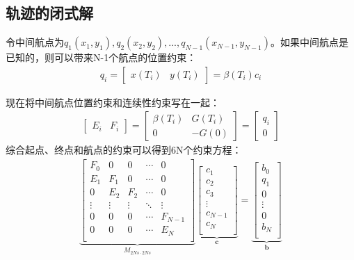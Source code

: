 \documentclass[master,academic]{ysuthesis} %
\begin{document}
		\subsection{轨迹的闭式解} 
		令中间航点为$q_1(x_1,y_1),q_2(x_2,y_2),...,q_{N-1}(x_{N-1},y_{N-1})$。如果中间航点是已知的，则可以带来N-1个航点的位置约束：
		\begin{equation}
			\begin{aligned}
				q_i = \begin{bmatrix}
					x(T_i)& y(T_i)
				\end{bmatrix} = \beta(T_i)c_i
			\end{aligned}
		\end{equation}
		
		现在将中间航点位置约束和连续性约束写在一起：
		\begin{equation}
			\begin{aligned}
				\begin{bmatrix}
					E_i &F_i
				\end{bmatrix}=
				\begin{bmatrix}
					\beta ( T_i )& G( T_i ) \\
					0 & -G( 0 )
				\end{bmatrix}  =\begin{bmatrix}
					q_i\\
					0
				\end{bmatrix}
			\end{aligned}
		\end{equation}
		综合起点、终点和航点的约束可以得到6N个约束方程：
		\begin{equation}
			\begin{aligned}
				\underbrace{\begin{bmatrix}
					F_0&		0&		0&		\cdots&		0\\
					E_1&		F_1&		0&		\cdots&		0\\
					0&		E_2&		F_2&		\cdots&		0\\
					\vdots&		\vdots&		\vdots&		\ddots&		\vdots\\
					0&		0&		0&		\cdots&		F_{N-1}\\
					0&		0&		0&		\cdots&		E_N\\
				\end{bmatrix}}_{M_{2Ns\cdot2Ns}}
				\underbrace{ \begin{bmatrix}
					c_1\\
					c_2\\
					c_3\\
					\vdots\\
					c_{N-1}\\
					c_N\\
				\end{bmatrix}}_{\mathbf{c}} =
				\underbrace{\begin{bmatrix}
					b_0\\
					q_1\\
					0\\
					\vdots\\
					0\\
					b_N\\
				\end{bmatrix}}_{\mathbf{b}} 
			\end{aligned}
			\label{eq:minco参数化}
		\end{equation}
\end{document}
